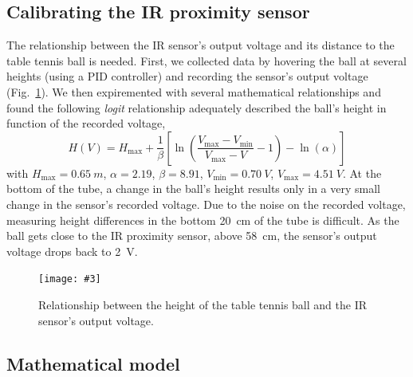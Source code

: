 \documentclass[10pt,twoside,openright]{article}
\newcommand{\mijnfiguur}[5][ht]{            %
    \begin{figure}[#1]                      %
        \begin{center}                      %
            \texttt{[image: \#3]}        %
        \end{center}
        \caption{#4\label{#5}}          %
    \end{figure}
    }
\begin{document}
\subsection{Calibrating the IR proximity sensor}
The relationship between the IR sensor's output voltage and its distance to the table tennis ball is needed. First, we collected data by hovering the ball at several heights (using a PID controller) and recording the sensor's output voltage (Fig.~\ref{fig:sensor_calibration}). We then expiremented with several mathematical relationships and found the following \textit{logit} relationship adequately described the ball's height in function of the recorded voltage,
\begin{equation}\label{eq:calibration_sensor}
H(V) = H_{\text{max}} + \dfrac{1}{\beta} \left[ \ln \left( \dfrac{V_{\text{max}} - V_{\text{min}}}{V_{\text{max}} - V} - 1 \right) - \ln(\alpha) \right]
\end{equation}
with $H_{\text{max}} = 0.65~m$, $\alpha = 2.19$, $\beta = 8.91$, $V_{\text{min}} = 0.70~V$, $V_{\text{max}} = 4.51~V$. At the bottom of the tube, a change in the ball's height results only in a very small change in the sensor's recorded voltage. Due to the noise on the recorded voltage, measuring height differences in the bottom 20~cm of the tube is difficult. As the ball gets close to the IR proximity sensor, above 58~cm, the sensor's output voltage drops back to 2~V.

\mijnfiguur[h!]{width=\linewidth}{calibration_sensor.pdf}{Relationship between the height of the table tennis ball and the IR sensor's output voltage.}{fig:sensor_calibration}

\subsection{Mathematical model}
\end{document}

